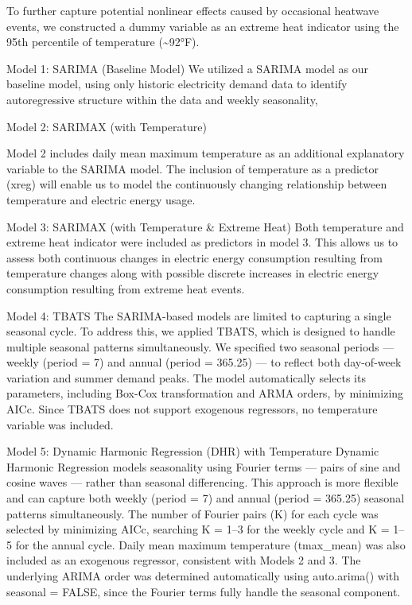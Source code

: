 \documentclass[
]{article}
\begin{document}
To further capture potential nonlinear effects caused by occasional
heatwave events, we constructed a dummy variable as an extreme heat
indicator using the 95th percentile of temperature
(\textasciitilde92°F).

Model 1: SARIMA (Baseline Model) We utilized a SARIMA model as our
baseline model, using only historic electricity demand data to identify
autoregressive structure within the data and weekly seasonality,

Model 2: SARIMAX (with Temperature)

Model 2 includes daily mean maximum temperature as an additional
explanatory variable to the SARIMA model. The inclusion of temperature
as a predictor (xreg) will enable us to model the continuously changing
relationship between temperature and electric energy usage.

Model 3: SARIMAX (with Temperature \& Extreme Heat) Both temperature and
extreme heat indicator were included as predictors in model 3. This
allows us to assess both continuous changes in electric energy
consumption resulting from temperature changes along with possible
discrete increases in electric energy consumption resulting from extreme
heat events.

Model 4: TBATS The SARIMA-based models are limited to capturing a single
seasonal cycle. To address this, we applied TBATS, which is designed to
handle multiple seasonal patterns simultaneously. We specified two
seasonal periods --- weekly (period = 7) and annual (period = 365.25)
--- to reflect both day-of-week variation and summer demand peaks. The
model automatically selects its parameters, including Box-Cox
transformation and ARMA orders, by minimizing AICc. Since TBATS does not
support exogenous regressors, no temperature variable was included.

Model 5: Dynamic Harmonic Regression (DHR) with Temperature Dynamic
Harmonic Regression models seasonality using Fourier terms --- pairs of
sine and cosine waves --- rather than seasonal differencing. This
approach is more flexible and can capture both weekly (period = 7) and
annual (period = 365.25) seasonal patterns simultaneously. The number of
Fourier pairs (K) for each cycle was selected by minimizing AICc,
searching K = 1--3 for the weekly cycle and K = 1--5 for the annual
cycle. Daily mean maximum temperature (tmax\_mean) was also included as
an exogenous regressor, consistent with Models 2 and 3. The underlying
ARIMA order was determined automatically using auto.arima() with
seasonal = FALSE, since the Fourier terms fully handle the seasonal
component.
\end{document}
